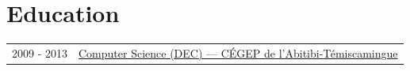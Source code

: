
\section{Education}
\begin{tabularx}{\linewidth}{@{}l X@{}}	
2009 - 2013 & \href{https://www.cegepat.qc.ca/programmes-etudes/administration/techniques-informatique/}{Computer Science (DEC) — CÉGEP de l'Abitibi-Témiscamingue} \\
\end{tabularx}

\vfill
